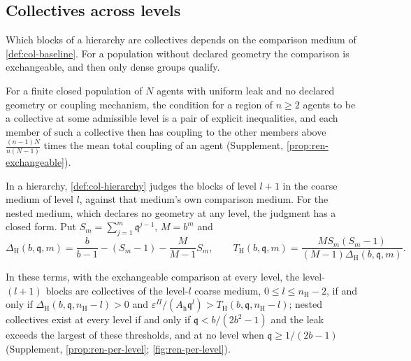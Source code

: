 \subsection{Collectives across levels}\label{sec:ren-levels}

Which blocks of a hierarchy are collectives depends on the comparison medium of \cref{def:col-baseline}. For a population without declared geometry the comparison is exchangeable, and then only dense groups qualify.

For a finite closed population of $N$ agents with uniform leak and no declared geometry or coupling mechanism, the condition for a region of $n\ge2$ agents to be a collective at some admissible level is a pair of explicit inequalities, and each member of such a collective then has coupling to the other members above $\frac{(n-1)N}{n(N-1)}$ times the mean total coupling of an agent (Supplement, \cref{prop:ren-exchangeable}).

In a hierarchy, \cref{def:col-hierarchy} judges the blocks of level $l+1$ in the coarse medium of level $l$, against that medium's own comparison medium. For the nested medium, which declares no geometry at any level, the judgment has a closed form. Put $S_m=\sum_{j=1}^m\mathfrak q^{j-1}$, $M=b^m$ and
\[
\Delta_{\mathrm H}(b,\mathfrak q,m)=\frac b{b-1}-(S_m-1)-\frac M{M-1}S_m,\qquad T_{\mathrm H}(b,\mathfrak q,m)=\frac{MS_m(S_m-1)}{(M-1)\Delta_{\mathrm H}(b,\mathfrak q,m)}.
\]

In these terms, with the exchangeable comparison at every level, the level-$(l+1)$ blocks are collectives of the level-$l$ coarse medium, $0\le l\le n_{\mathrm H}-2$, if and only if $\Delta_{\mathrm H}(b,\mathfrak q,n_{\mathrm H}-l)>0$ and $\varepsilon^\Pi/(A_{\mathrm h}\mathfrak q^l)>T_{\mathrm H}(b,\mathfrak q,n_{\mathrm H}-l)$; nested collectives exist at every level if and only if $\mathfrak q<b/(2b^2-1)$ and the leak exceeds the largest of these thresholds, and at no level when $\mathfrak q\ge1/(2b-1)$ (Supplement, \cref{prop:ren-per-level}; \cref{fig:ren-per-level}).

